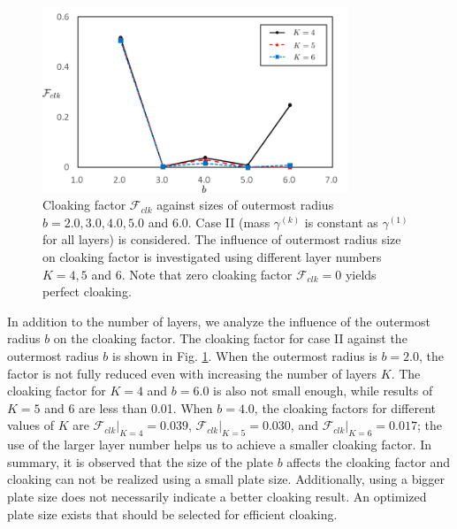 \documentclass{jfm}
\begin{document}
\begin{figure}
 \centering
 \includegraphics[width=3.6in]{fig/fig5.png}
  \caption{Cloaking factor $\mathcal{F}_{clk}$ against sizes of outermost radius $b=2.0,3.0,4.0,5.0$ and 6.0. Case II (mass $\gamma^{(k)}$ is constant as $\gamma^{(1)}$ for all layers) is considered. The influence of outermost radius size on cloaking factor is investigated using different layer numbers $K=4,5$ and 6. Note that zero cloaking factor $\mathcal{F}_{clk}=0$ yields perfect cloaking.}
\label{fig5}
\end{figure}
In addition to the number of layers, we analyze the influence of the outermost radius $b$ on the cloaking factor. The cloaking factor for case II against the outermost radius $b$ is shown in  Fig. \ref{fig5}.
When the outermost radius is $b=2.0$, the factor is not fully reduced even with increasing the number of layers $K$. The cloaking factor for $K=4$ and $b=6.0$ is also not small enough, while results of $K=5$ and $6$ are less than 0.01. When $b=4.0$, the cloaking factors for different values of $K$ are $\mathcal{F}_{clk}|_{K=4}=0.039$, $\mathcal{F}_{clk}|_{K=5}=0.030$, and $\mathcal{F}_{clk}|_{K=6}=0.017$; the use of the larger layer number helps us to achieve a smaller cloaking factor. In summary, it is observed that the size of the plate $b$ affects the cloaking factor and cloaking can not be realized using a small plate size. Additionally, using a bigger plate size does not necessarily indicate a better cloaking result. An optimized plate size exists that should be selected for efficient cloaking. 
\end{document}
